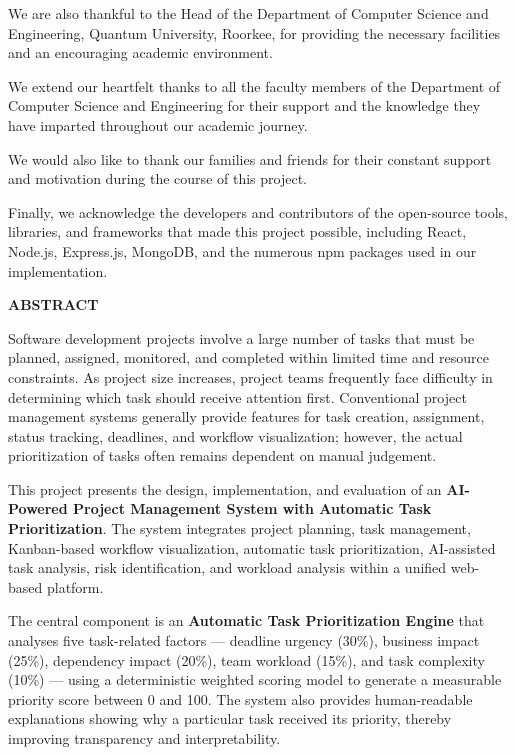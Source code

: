 \documentclass[12pt,a4paper,oneside]{report}
\begin{document}
We are also thankful to the Head of the Department of Computer Science and Engineering, Quantum University, Roorkee, for providing the necessary facilities and an encouraging academic environment.

We extend our heartfelt thanks to all the faculty members of the Department of Computer Science and Engineering for their support and the knowledge they have imparted throughout our academic journey.

We would also like to thank our families and friends for their constant support and motivation during the course of this project.

Finally, we acknowledge the developers and contributors of the open-source tools, libraries, and frameworks that made this project possible, including React, Node.js, Express.js, MongoDB, and the numerous npm packages used in our implementation.
\thispagestyle{plain}

\newpage
\begin{center}
{\large\textbf{ABSTRACT}}
\end{center}
\vspace{1cm}
\noindent
Software development projects involve a large number of tasks that must be planned, assigned, monitored, and completed within limited time and resource constraints. As project size increases, project teams frequently face difficulty in determining which task should receive attention first. Conventional project management systems generally provide features for task creation, assignment, status tracking, deadlines, and workflow visualization; however, the actual prioritization of tasks often remains dependent on manual judgement.

This project presents the design, implementation, and evaluation of an \textbf{AI-Powered Project Management System with Automatic Task Prioritization}. The system integrates project planning, task management, Kanban-based workflow visualization, automatic task prioritization, AI-assisted task analysis, risk identification, and workload analysis within a unified web-based platform.

The central component is an \textbf{Automatic Task Prioritization Engine} that analyses five task-related factors --- deadline urgency (30\%), business impact (25\%), dependency impact (20\%), team workload (15\%), and task complexity (10\%) --- using a deterministic weighted scoring model to generate a measurable priority score between 0 and 100. The system also provides human-readable explanations showing why a particular task received its priority, thereby improving transparency and interpretability.
\end{document}
